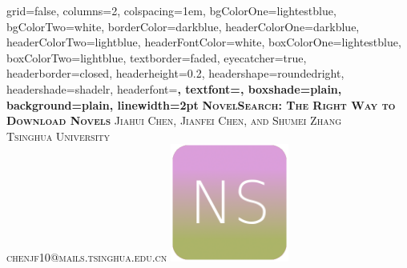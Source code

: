 \documentclass[portrait,final,a1paper,fontscale=0.277]{baposter}
\begin{document}


\begin{poster}%
  {
  grid=false,
  columns=2,
  colspacing=1em,
  bgColorOne=lightestblue,
  bgColorTwo=white,
  borderColor=darkblue,
  headerColorOne=darkblue,
  headerColorTwo=lightblue,
  headerFontColor=white,
  boxColorOne=lightestblue,
  boxColorTwo=lightblue,
  textborder=faded,
  eyecatcher=true,
  headerborder=closed,
  headerheight=0.2\textheight,
  headershape=roundedright,
  headershade=shadelr,
  headerfont=\Large\bf\textsc, %
  textfont={\setlength{\parindent}{1.5em}},
  boxshade=plain,
  background=plain,
  linewidth=2pt
  }
 {} 
  {\bf\textsc{NovelSearch: The Right Way to Download Novels}\vspace{0.5em}}
  {\textsc{Jiahui Chen, Jianfei Chen, and Shumei Zhang\\Tsinghua University\\{chenjf10@mails.tsinghua.edu.cn}}}
  {%
    \includegraphics[height=10.5em]{images/logo.png}
  }

    \newcommand{\colouredcircle}{%
      \tikz{\useasboundingbox (-0.2em,-0.32em) rectangle(0.2em,0.32em); \draw[draw=black,fill=lightblue,line width=0.03em] (0,0) circle(0.18em);}}


\end{poster}
\end{document}
